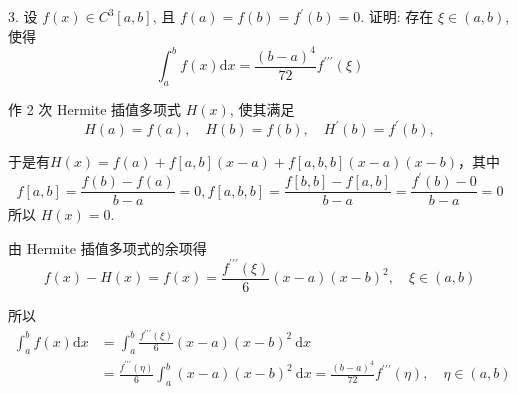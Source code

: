 \begin{tcolorbox}[breakable,enhanced,arc=0mm,outer arc=0mm,
		boxrule=0pt,toprule=1pt,leftrule=0pt,bottomrule=1pt, rightrule=0pt,left=0.2cm,right=0.2cm,
		titlerule=0.5em,toptitle=0.1cm,bottomtitle=-0.1cm,top=0.2cm,
		colframe=white!10!biru,colback=white!90!biru,coltitle=white,
            coltext=black,title =2024-05, title style={white!10!biru}, before skip=8pt, after skip=8pt,before upper=\hspace{2em},
		fonttitle=\bfseries,fontupper=\normalsize]
  
 3. 设 $ f(x) \in C^{3}[a, b] $, 且 $ f(a)=f(b)=f^{\prime}(b)=0 $. 证明: 存在 $ \xi \in(a, b) $, 使得
$$
\int_{a}^{b} f(x) \mathrm{d} x=\frac{(b-a)^{4}}{72} f^{\prime \prime \prime}(\xi)
$$
\tcblower

 作 2 次 Hermite 插值多项式 $ H(x) $, 使其满足
$$
H(a)=f(a), \quad H(b)=f(b), \quad H^{\prime}(b)=f^{\prime}(b),
$$

于是有$H(x)=f(a)+f[a,b](x-a)+f[a,b,b](x-a)(x-b)$，其中
$$f[a,b]=\frac{f(b)-f(a)}{b-a}=0,f[a,b,b]=\frac{f[b,b]-f[a,b]}{b-a}=\frac{f^{\prime}(b)-0}{b-a}=0$$
 所以 $ H(x)=0 $. 


由 Hermite 插值多项式的余项得
$$
f(x)-H(x)=f(x)=\frac{f^{\prime \prime \prime}(\xi)}{6}(x-a)(x-b)^{2}, \quad \xi \in(a, b)
$$

所以
$$
\begin{aligned}
\int_{a}^{b} f(x) \mathrm{d} x & =\int_{a}^{b} \frac{f^{\prime \prime \prime}(\xi)}{6}(x-a)(x-b)^{2} \mathrm{~d} x\\&=\frac{f^{\prime \prime \prime}(\eta)}{6} \int_{a}^{b}(x-a)(x-b)^{2} \mathrm{~d} x  =\frac{(b-a)^{4}}{72} f^{\prime \prime \prime}(\eta), \quad \eta \in(a, b)
\end{aligned}
$$
  \end{tcolorbox}

